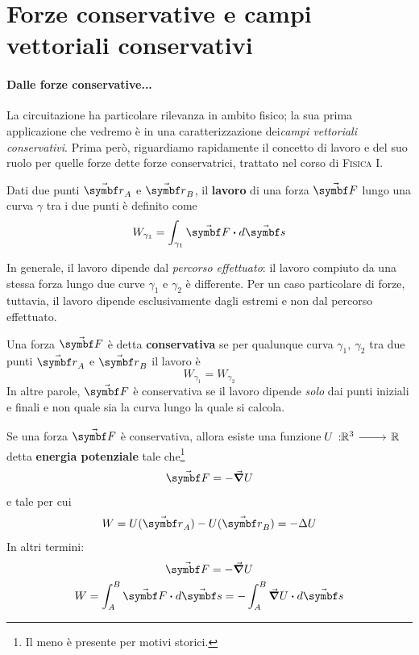 \section{Forze conservative e campi vettoriali conservativi}
\paragraph{Dalle forze conservative...}
La circuitazione ha particolare rilevanza in ambito fisico; la sua prima applicazione che vedremo è in una caratterizzazione dei\textit{campi vettoriali conservativi}. Prima però, riguardiamo rapidamente il concetto di lavoro e del suo ruolo per quelle forze dette forze conservatrici, trattato nel corso di \textsc{Fisica I}.
\begin{define}[Lavoro]
	Dati due punti $\vba{r}_A$ e $\vba{r}_B$, il \textbf{lavoro} di una forza $\vba{F}$ lungo una curva $\gamma$ tra i due punti è definito come
	\begin{equation}
		W_{\gamma_1}=\int_{\gamma_1}\vba{F}\vdot d\vba{s}
	\end{equation}
\end{define}
In generale, il lavoro dipende dal \textit{percorso effettuato}: il lavoro compiuto da una stessa forza lungo due curve $\gamma_1$ e $\gamma_2$  è differente. Per un caso particolare di forze, tuttavia, il lavoro dipende esclusivamente dagli estremi e non dal percorso effettuato.
\begin{define}
	Una forza $\vba{F}$ è detta \textbf{conservativa} se per qualunque curva $\gamma_1,\ \gamma_2$ tra due punti $\vba{r}_A$ e $\vba{r}_B$ il lavoro è
	\begin{equation}
		W_{\gamma_1}=W_{\gamma_2}
	\end{equation}
	In altre parole, $\vba{F}$ è conservativa se il lavoro dipende \textit{solo} dai punti iniziali e finali e non quale sia la curva lungo la quale si calcola.
\end{define}
\begin{proposition}\label{forzaconservativaproposizione}
	Se una forza $\vba{F}$ è conservativa, allora esiste una funzione $\funz[U]{\realset^3}{\realset}$ detta \textbf{energia potenziale} tale che\footnote{Il meno è presente per motivi storici.}
	\begin{equation}
		\vba{F}=-\grad{U}
	\end{equation}
	e tale per cui
	\begin{equation}
		W=U(\vba{r}_A)-U(\vba{r}_B)=-\Delta U
	\end{equation}
	In altri termini:
	\begin{gather}
		\vba{F}=-\grad{U}\\
		W=\int_A^{B}\vba{F}\vdot d\vba{s}=-\int_A^B\grad{U}\vdot d\vba{s}
	\end{gather}
\end{proposition}
